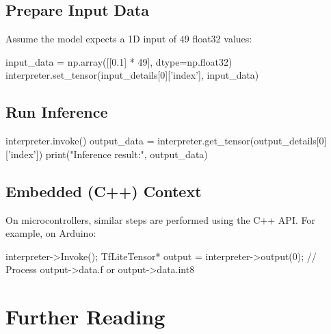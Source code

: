 \subsection{Prepare Input Data}



Assume the model expects a 1D input of 49 float32 values:



\medskip
{
  \begin{Python}
input_data = np.array([[0.1] * 49], dtype=np.float32)
interpreter.set_tensor(input_details[0]['index'], input_data)
  \end{Python}
}


\subsection{Run Inference}



{
  \begin{Python}
interpreter.invoke()
output_data = interpreter.get_tensor(output_details[0]['index'])
print("Inference result:", output_data)
  \end{Python}
}


\subsection{Embedded (C++) Context}



On microcontrollers, similar steps are performed using the C++ API. For example, on Arduino:


\medskip

  \begin{Python}
interpreter->Invoke();
TfLiteTensor* output = interpreter->output(0);
// Process output->data.f or output->data.int8
  \end{Python}



\section{Further Reading}



\nocite{Google:2025}

\nocite{David:2021}

\nocite{Warden:2020}



